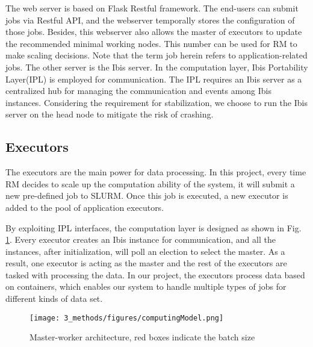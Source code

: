 The web server is based on Flask Restful framework. The end-users can submit jobs via Restful API, and the webserver temporally stores the configuration of those jobs. 
Besides, this webserver also allows the master of executors to update the recommended minimal working nodes. 
This number can be used for RM to make scaling decisions. 
Note that the term job herein refers to application-related jobs. The other server is the Ibis server. In the computation layer, Ibis Portability Layer(IPL)\cite{5492667} is employed for communication. 
The IPL requires an Ibis server as a centralized hub for managing the communication and events among Ibis instances. 
Considering the requirement for stabilization, we choose to run the Ibis server on the head node to mitigate the risk of crashing.
 
\subsection{Executors}
The executors are the main power for data processing. 
In this project, every time RM decides to scale up the computation ability of the system, it will submit a new pre-defined job to SLURM. 
Once this job is executed, a new executor is added to the pool of application executors.

By exploiting IPL interfaces, the computation layer is designed as shown in Fig. \ref{3_methods/figures/computingModel.png}. 
Every executor creates an Ibis instance for communication, and all the instances, after initialization, will poll an election to select the master. 
As a result, one executor is acting as the master and the rest of the executors are tasked with processing the data.
In our project, the executors process data based on containers, which enables our system to handle multiple types of jobs for different kinds of data set.

\begin{figure}
  \centering
  \texttt{[image: 3\_methods/figures/computingModel.png]}
  \caption[Distributed computing model]{Master-worker architecture, red boxes indicate the batch size}
  \label{3_methods/figures/computingModel.png}
\end{figure}

